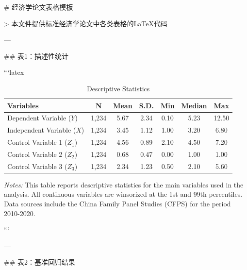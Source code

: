 # 经济学论文表格模板

> 本文件提供标准经济学论文中各类表格的LaTeX代码

---

## 表1：描述性统计

```latex
\begin{table}[htbp]
\centering
\caption{ Descriptive Statistics}
\label{tab:desc_stat}
\scriptsize
\begin{tabular}{lcccccc}
\toprule
Variables & N & Mean & S.D. & Min & Median & Max \\
\midrule
Dependent Variable ($Y$) & 1,234 & 5.67 & 2.34 & 0.10 & 5.23 & 12.50 \\
Independent Variable ($X$) & 1,234 & 3.45 & 1.12 & 1.00 & 3.20 & 6.80 \\
Control Variable 1 ($Z_1$) & 1,234 & 4.56 & 0.89 & 2.10 & 4.50 & 7.20 \\
Control Variable 2 ($Z_2$) & 1,234 & 0.68 & 0.47 & 0.00 & 1.00 & 1.00 \\
Control Variable 3 ($Z_3$) & 1,234 & 2.34 & 1.23 & 0.50 & 2.10 & 5.60 \\
\bottomrule
\end{tabular}
\begin{minipage}{\linewidth}
\smallskip
\textit{Notes:} This table reports descriptive statistics for the main variables used in the analysis. All continuous variables are winsorized at the 1st and 99th percentiles. Data sources include the China Family Panel Studies (CFPS) for the period 2010-2020.
\end{minipage}
\end{table}
```

---

## 表2：基准回归结果

